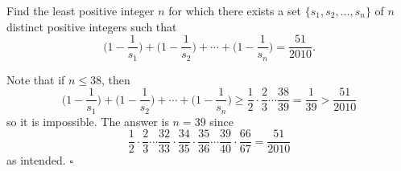 
\begin{problem}[ISL 2010 N1]
    Find the least positive integer $n$ for which there exists a set
    $\{s_1, s_2, \ldots, s_n\}$ of $n$ distinct positive integers such that
    \[\bigg(1-\frac{1}{s_1}\bigg) + \bigg(1-\frac{1}{s_2}\bigg) + \cdots + \bigg(1-\frac{1}{s_n}\bigg) = \frac{51}{2010}.\]
\end{problem}

\begin{solution}[Ritwin]
    Note that if $n \leq 38$, then
    \[\bigg(1-\frac{1}{s_1}\bigg) + \bigg(1-\frac{1}{s_2}\bigg) + \cdots + \bigg(1-\frac{1}{s_n}\bigg) \geq \frac12 \cdot \frac23 \cdots \frac{38}{39} = \frac{1}{39} > \frac{51}{2010}\]
    so it is impossible. The answer is $\boxed{n=39}$ since
    \[\frac12 \cdot \frac23 \cdots \frac{32}{33} \cdot \frac{34}{35} \cdot \frac{35}{36} \cdots \frac{39}{40} \cdot \frac{66}{67} = \frac{51}{2010}\]
    as intended. $\square$
\end{solution}
